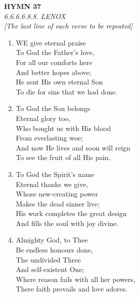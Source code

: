 \newpage
\begin{center}
    {\Large \textbf{HYMN 37}}
    \\
    \textit{6.6.6.6.8.8. LENOX}
    \\
    \textit{\small [The last line of each verse to be repeated]}
\end{center}
\vspace{1em}

\begin{enumerate}
    \item WE give eternal praise \\
        To God the Father's love, \\
        For all our comforts here \\
        And better hopes above; \\
        He sent His own eternal Son \\
        To die for sins that we had done.

    \item To God the Son belongs \\
        Eternal glory too, \\
        Who bought us with His blood \\
        From everlasting woe; \\
        And now He lives and soon will reign \\
        To see the fruit of all His pain.

    \item To God the Spirit's name \\
        Eternal thanks we give, \\
        Whose new-creating power \\
        Makes the dead sinner live; \\
        His work completes the great design \\
        And fills the soul with joy divine.

    \item Almighty God, to Thee \\
        Be endless honours done, \\
        The undivided Three \\
        And self-existent One; \\
        Where reason fails with all her powers, \\
        There faith prevails and love adores.

\end{enumerate}
